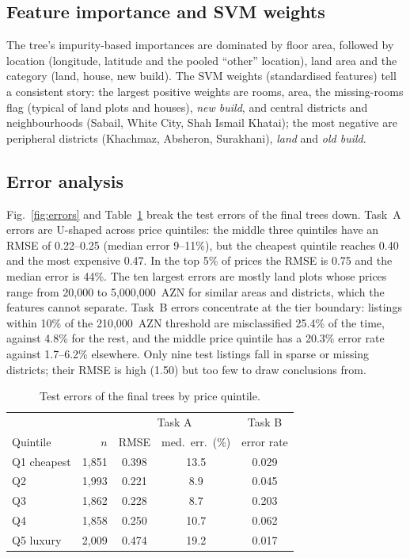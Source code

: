 \documentclass[10pt,twocolumn,a4paper]{article}
\begin{document}
\subsection{Feature importance and SVM weights}
The tree's impurity-based importances are dominated by floor area,
followed by location (longitude, latitude and the pooled ``other''
location), land area and the category (land, house, new build). The SVM
weights (standardised features) tell a consistent story: the largest
positive weights are rooms, area, the missing-rooms flag (typical of land
plots and houses), \emph{new build}, and central districts and
neighbourhoods (Sabail, White City, Shah Ismail Khatai); the most negative
are peripheral districts (Khachmaz, Absheron, Surakhani), \emph{land} and
\emph{old build}.

\subsection{Error analysis}
Fig.~\ref{fig:errors} and Table~\ref{tab:bands} break the test errors of
the final trees down. Task~A errors are U-shaped across price quintiles:
the middle three quintiles have an RMSE of 0.22--0.25 (median error
9--11\%), but the cheapest quintile reaches 0.40 and the most expensive
0.47. In the top 5\% of prices the RMSE is 0.75 and the median error is
44\%. The ten largest errors are mostly land plots whose prices range from
20,000 to 5,000,000~AZN for similar areas and districts, which the
features cannot separate. Task~B errors concentrate at the tier boundary:
listings within 10\% of the 210,000~AZN threshold are misclassified
25.4\% of the time, against 4.8\% for the rest, and the middle price
quintile has a 20.3\% error rate against 1.7--6.2\% elsewhere. Only nine
test listings fall in sparse or missing districts; their RMSE is high
(1.50) but too few to draw conclusions from.



\begin{table}[t]
  \centering
  \caption{Test errors of the final trees by price quintile.}
  \label{tab:bands}
  \begin{tabular}{@{}lrccc@{}}
    \toprule
    & & \multicolumn{2}{c}{Task A} & Task B \\
    Quintile & $n$ & RMSE & med.\ err.\ (\%) & error rate \\
    \midrule
    Q1 cheapest & 1,851 & 0.398 & 13.5 & 0.029 \\
    Q2          & 1,993 & 0.221 &  8.9 & 0.045 \\
    Q3          & 1,862 & 0.228 &  8.7 & 0.203 \\
    Q4          & 1,858 & 0.250 & 10.7 & 0.062 \\
    Q5 luxury   & 2,009 & 0.474 & 19.2 & 0.017 \\
    \bottomrule
  \end{tabular}
\end{table}
\end{document}
